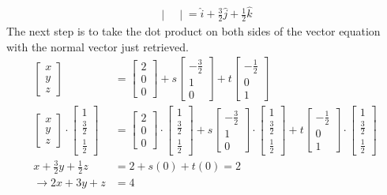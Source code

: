 \begin{solution}
\begin{align*}
\begin{vmatrix}
\end{vmatrix}
= \hat{i} + \frac{3}{2}\hat{j} + \frac{1}{2}\hat{k}
\end{align*}
The next step is to take the dot product on both sides of the vector equation with the normal vector just retrieved.
\begin{align*}
\begin{bmatrix}
x \\
y \\
z
\end{bmatrix}
&=
\begin{bmatrix}
2 \\
0 \\
0
\end{bmatrix}
+ s
\begin{bmatrix}
-\frac{3}{2} \\
1 \\
0
\end{bmatrix}
+ t
\begin{bmatrix}
-\frac{1}{2} \\
0 \\
1
\end{bmatrix} \\
\begin{bmatrix}
x \\
y \\
z
\end{bmatrix}
\cdot
\begin{bmatrix}
1 \\
\frac{3}{2} \\
\frac{1}{2}
\end{bmatrix}
&=
\begin{bmatrix}
2 \\
0 \\
0
\end{bmatrix}
\cdot
\begin{bmatrix}
1 \\
\frac{3}{2} \\
\frac{1}{2}
\end{bmatrix}
+ s
\begin{bmatrix}
-\frac{3}{2} \\
1 \\
0
\end{bmatrix}
\cdot
\begin{bmatrix}
1 \\
\frac{3}{2} \\
\frac{1}{2}
\end{bmatrix}
+ t
\begin{bmatrix}
-\frac{1}{2} \\
0 \\
1
\end{bmatrix}
\cdot
\begin{bmatrix}
1 \\
\frac{3}{2} \\
\frac{1}{2}
\end{bmatrix} \\
x + \frac{3}{2}y + \frac{1}{2}z &= 2 + s(0) + t(0) = 2 \\
\rightarrow 2x+3y+z &= 4
\end{align*}
\end{solution}
